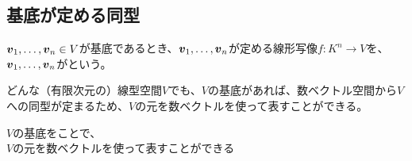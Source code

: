 \documentclass[../../../topic_linear-algebra]{subfiles}
\begin{document}
\subsection{基底が定める同型}\label{sec:basis-induced-isomorphism}

$\vb*{v}_1, \ldots, \vb*{v}_n \in V$が基底であるとき、$\vb*{v}_1, \ldots, \vb*{v}_n$が定める線形写像$f\colon K^n \to V$を、$\vb*{v}_1, \ldots, \vb*{v}_n$がという。

\br

どんな（有限次元の）線型空間$V$でも、$V$の基底があれば、数ベクトル空間から$V$への同型が定まるため、$V$の元を数ベクトルを使って表すことができる。

\begin{emphabox}
  \begin{spacebox}
    \begin{center}
      $V$の基底をことで、\\
      $V$の元を数ベクトルを使って表すことができる
    \end{center}
  \end{spacebox}
\end{emphabox}
\end{document}
